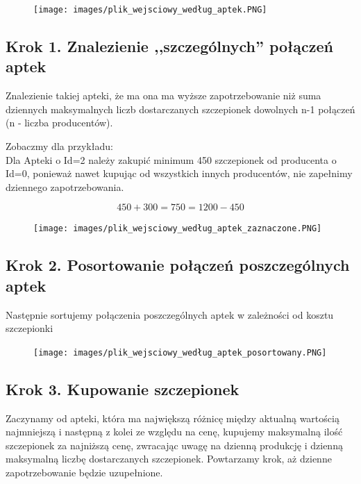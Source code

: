 \documentclass{article}
\begin{document}
\begin{figure} [hbt!]
    \texttt{[image: images/plik\_wejsciowy\_według\_aptek.PNG]}
\end{figure}

\clearpage

\subsection{Krok 1. Znalezienie ,,szczególnych'' połączeń aptek}
Znalezienie takiej apteki, że ma ona ma wyższe zapotrzebowanie niż suma dziennych maksymalnych liczb dostarczanych szczepionek dowolnych n-1 połączeń (n - liczba producentów). 
\\ 
\par Zobaczmy dla przykładu: \\
Dla Apteki o Id=2 należy zakupić minimum 450 szczepionek od producenta o Id=0, ponieważ nawet kupując od wszystkich innych producentów, nie zapełnimy dziennego zapotrzebowania.

\[450+300=750 = 1200-450 \]

\begin{figure} [hbt!]
    \texttt{[image: images/plik\_wejsciowy\_według\_aptek\_zaznaczone.PNG]}
\end{figure}

\clearpage
\subsection{Krok 2. Posortowanie połączeń poszczególnych aptek}
Następnie sortujemy połączenia poszczególnych aptek w zależności od kosztu szczepionki

\begin{figure} [hbt!]
    \texttt{[image: images/plik\_wejsciowy\_według\_aptek\_posortowany.PNG]}
\end{figure}

\clearpage

\subsection{Krok 3. Kupowanie szczepionek}
Zaczynamy od apteki, która ma największą różnicę między aktualną wartością najmniejszą i następną z kolei ze względu na cenę, kupujemy maksymalną ilość szczepionek za najniższą cenę, zwracając uwagę na dzienną produkcję i dzienną maksymalną liczbę dostarczanych szczepionek. Powtarzamy krok, aż dzienne zapotrzebowanie będzie uzupełnione.
\end{document}
